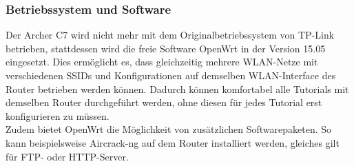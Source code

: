\subsubsection{Betriebssystem und Software}
Der Archer C7 wird nicht mehr mit dem Originalbetriebssystem von TP-Link betrieben, stattdessen wird die freie Software OpenWrt in der Version 15.05 eingesetzt. Dies ermöglicht es, dass gleichzeitig mehrere WLAN-Netze mit verschiedenen SSIDs und Konfigurationen auf demselben WLAN-Interface des Router betrieben werden können. Dadurch können komfortabel alle Tutorials mit demselben Router durchgeführt werden, ohne diesen für jedes Tutorial erst konfigurieren zu müssen.\\
Zudem bietet OpenWrt die Möglichkeit von zusätzlichen Softwarepaketen. So kann beispielsweise Aircrack-ng auf dem Router installiert werden, gleiches gilt für FTP- oder HTTP-Server.

